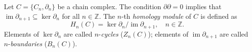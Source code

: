 Let $C = \{C_n, \partial_n\}$ be a chain complex. The condition $\partial \partial = 0$ implies that $\operatorname{im} \partial_{n+1} \subseteq \ker \partial_n$ for all $n \in \mathbb{Z}$. The $n$-th \textit{homology module} of $C$ is defined as
$$H_n(C) = \ker \partial_n / \operatorname{im} \partial_{n+1}, \quad n \in \mathbb{Z}.$$
Elements of $\ker \partial_n$ are called $n$-\textit{cycles} ($Z_n(C)$); elements of $\operatorname{im} \partial_{n+1}$ are called $n$-\textit{boundaries} ($B_n(C)$).